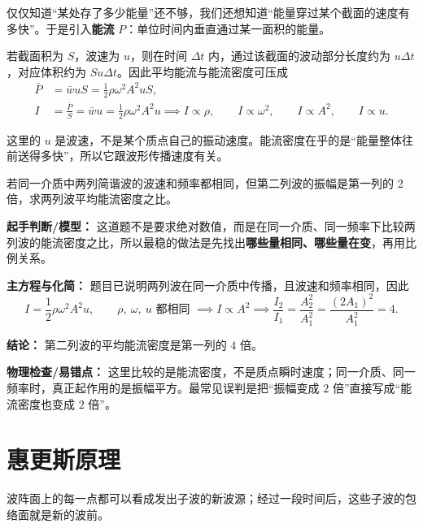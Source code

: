 \documentclass[lang=cn,11pt]{elegantbook}
\begin{document}
仅仅知道“某处存了多少能量”还不够，我们还想知道“能量穿过某个截面的速度有多快”。于是引入\textbf{能流} \(P\)：单位时间内垂直通过某一面积的能量。

若截面积为 \(S\)，波速为 \(u\)，则在时间 \(\Delta t\) 内，通过该截面的波动部分长度约为 \(u\Delta t\)，对应体积约为 \(Su\Delta t\)。因此平均能流与能流密度可压成
\[
\begin{aligned}
\bar P&=\bar w uS=\frac12 \rho\omega^2A^2uS,\\
I&=\frac{\bar P}{S}=\bar w u=\frac12 \rho\omega^2A^2u
\implies
I\propto \rho,\qquad
I\propto \omega^2,\qquad
I\propto A^2,\qquad
I\propto u.
\end{aligned}
\]

\begin{remark}
这里的 \(u\) 是波速，不是某个质点自己的振动速度。能流密度在乎的是“能量整体往前送得多快”，所以它跟波形传播速度有关。
\end{remark}

\begin{example}[振幅加倍时能流密度怎样变]
若同一介质中两列简谐波的波速和频率都相同，但第二列波的振幅是第一列的 2 倍，求两列波平均能流密度之比。
\end{example}

\begin{solution}
\textbf{起手判断/模型：} 这道题不是要求绝对数值，而是在同一介质、同一频率下比较两列波的能流密度之比，所以最稳的做法是先找出\textbf{哪些量相同、哪些量在变}，再用比例关系。

\textbf{主方程与化简：} 题目已说明两列波在同一介质中传播，且波速和频率相同，因此
\[
I=\frac{1}{2}\rho\omega^2A^2u,\qquad
\rho,\ \omega,\ u \text{ 都相同 } \implies I\propto A^2
\implies
\frac{I_2}{I_1}=\frac{A_2^2}{A_1^2}
=\frac{(2A_1)^2}{A_1^2}=4.
\]

\textbf{结论：} 第二列波的平均能流密度是第一列的 \(4\) 倍。

\textbf{物理检查/易错点：} 这里比较的是能流密度，不是质点瞬时速度；同一介质、同一频率时，真正起作用的是振幅平方。最常见误判是把“振幅变成 \(2\) 倍”直接写成“能流密度也变成 \(2\) 倍”。
\end{solution}

\section{惠更斯原理}

\begin{theorem}[惠更斯原理]
波阵面上的每一点都可以看成发出子波的新波源；经过一段时间后，这些子波的包络面就是新的波前。
\end{theorem}
\end{document}
